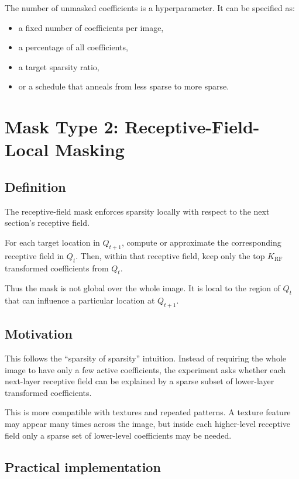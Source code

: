 \documentclass[11pt]{article}
\begin{document}
The number of unmasked coefficients is a hyperparameter. It can be specified as:
\begin{itemize}[leftmargin=*]
    \item a fixed number of coefficients per image,
    \item a percentage of all coefficients,
    \item a target sparsity ratio,
    \item or a schedule that anneals from less sparse to more sparse.
\end{itemize}

\section{Mask Type 2: Receptive-Field-Local Masking}

\subsection{Definition}

The receptive-field mask enforces sparsity locally with respect to the next section's receptive field.

For each target location in \(Q_{t+1}\), compute or approximate the corresponding receptive field in \(Q_t\). Then, within that receptive field, keep only the top \(K_{\text{RF}}\) transformed coefficients from \(Q_t\).

Thus the mask is not global over the whole image. It is local to the region of \(Q_t\) that can influence a particular location at \(Q_{t+1}\).

\subsection{Motivation}

This follows the ``sparsity of sparsity'' intuition. Instead of requiring the whole image to have only a few active coefficients, the experiment asks whether each next-layer receptive field can be explained by a sparse subset of lower-layer transformed coefficients.

This is more compatible with textures and repeated patterns. A texture feature may appear many times across the image, but inside each higher-level receptive field only a sparse set of lower-level coefficients may be needed.

\subsection{Practical implementation}
\end{document}
